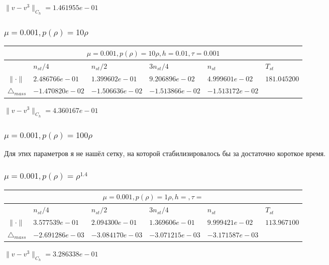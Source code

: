 \documentclass[12pt,a4paper]{article}
\begin{document}
$\|v-v^{3}\|_{C_h} = 1.461955e-01$

\subsubsection{$\mu = 0.001, p(\rho) = 10\rho $}

\begin{tabular}{*{6}{|l}|}
    \hline
     \\
    \hline
    &$n_{st}/4 $&$ n_{st}/2$&$3n_{st}/4$&$n_{st}$&$T_{st}$ \\
    \hline
$\|\cdot \|$& $2.486766e-01$ & $1.399602e-01$ & $9.206896e-02$ & $4.999601e-02$ &$181.045200$\\
\hline
$\triangle_{mass}$& $-1.470820e-02$ & $-1.506636e-02$ & $-1.513866e-02$ & $-1.513172e-02$ &\\
\hline
\end{tabular}

$\|v-v^{3}\|_{C_h} = 4.360167e-01$

\subsubsection{$\mu = 0.001, p(\rho) = 100\rho $}
Для этих параметров я не нашёл сетку, на которой стабилизировалось бы за достаточно короткое время.

\subsubsection{$\mu = 0.001, p(\rho) = \rho^{1.4} $}

\begin{tabular}{*{6}{|l}|}
    \hline
     \\
    \hline
    &$n_{st}/4 $&$ n_{st}/2$&$3n_{st}/4$&$n_{st}$&$T_{st}$ \\
    \hline
$\|\cdot \|$& $3.577539e-01$ & $2.094300e-01$ & $1.369606e-01$ & $9.999421e-02$ &$113.967100$\\
\hline
$\triangle_{mass}$& $-2.691286e-03$ & $-3.084170e-03$ & $-3.071215e-03$ & $-3.171587e-03$ &\\
\hline
\end{tabular}

$\|v-v^{3}\|_{C_h} = 3.286338e-01$
\newpage
\end{document}

